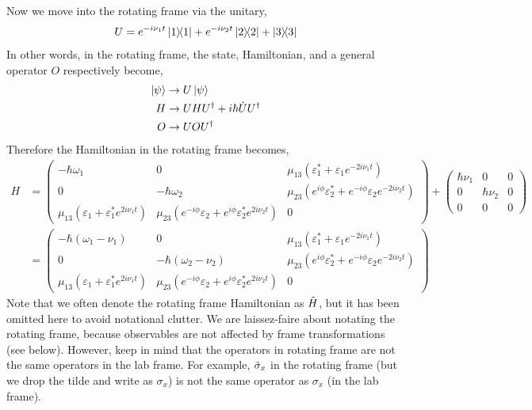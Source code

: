 \documentclass[10pt]{article}
\begin{document}
Now we move into the rotating frame via the unitary,
\begin{equation}
    U = e^{-i\nu_1 t}\ketbra{1}{1} + e^{-i\nu_2 t}\ketbra{2}{2} + \ketbra{3}{3}
\end{equation}
In other words, in the rotating frame, the state, Hamiltonian, and a general operator $O$ respectively become,
\begin{align}
    \ket{\psi} &\rightarrow U\ket{\psi}\\
    H &\rightarrow UHU^\dagger + i\hbar\dot{U}U^\dagger\\
    O &\rightarrow UOU^\dagger
\end{align}
Therefore the Hamiltonian in the rotating frame becomes,
\begin{align}
    H &= 
    \begin{pmatrix}
        -\hbar\omega_1 & 0 & \mu_{13}(\varepsilon_1^* + \varepsilon_1e^{-2i\nu_1 t}) \\
        0 & -\hbar \omega_2 & \mu_{23}(e^{i\phi}\varepsilon_2^* + e^{-i\phi}\varepsilon_2e^{-2i\nu_2 t}) \\
        \mu_{13}(\varepsilon_1 + \varepsilon_1^* e^{2i\nu_1 t}) & \mu_{23}(e^{-i\phi}\varepsilon_2 + e^{i\phi}\varepsilon_2^* e^{2i\nu_2 t}) & 0
    \end{pmatrix}
    +
    \begin{pmatrix}
        \hbar\nu_1 & 0 & 0\\
        0 & \hbar \nu_2 & 0 \\
        0 & 0 & 0
    \end{pmatrix}
    \\
    &=
    \begin{pmatrix}
        -\hbar(\omega_1-\nu_1) & 0 & \mu_{13}(\varepsilon_1^* + \varepsilon_1e^{-2i\nu_1 t}) \\
        0 & -\hbar (\omega_2 -\nu_2) & \mu_{23}(e^{i\phi}\varepsilon_2^* + e^{-i\phi}\varepsilon_2e^{-2i\nu_2 t}) \\
        \mu_{13}(\varepsilon_1 + \varepsilon_1^* e^{2i\nu_1 t}) & \mu_{23}(e^{-i\phi}\varepsilon_2 + e^{i\phi}\varepsilon_2^* e^{2i\nu_2 t}) & 0
    \end{pmatrix}
\end{align}
Note that we often denote the rotating frame Hamiltonian as $\Tilde{H}$, but it has been omitted here to avoid notational clutter. We are laissez-faire about notating the rotating frame, because observables are not affected by frame transformations (see below). However, keep in mind that the operators in rotating frame are not the same operators in the lab frame. For example, $\Tilde{\sigma}_x$ in the rotating frame (but we drop the tilde and write as $\sigma_x$) is not the same operator as $\sigma_x$ (in the lab frame).
\end{document}
